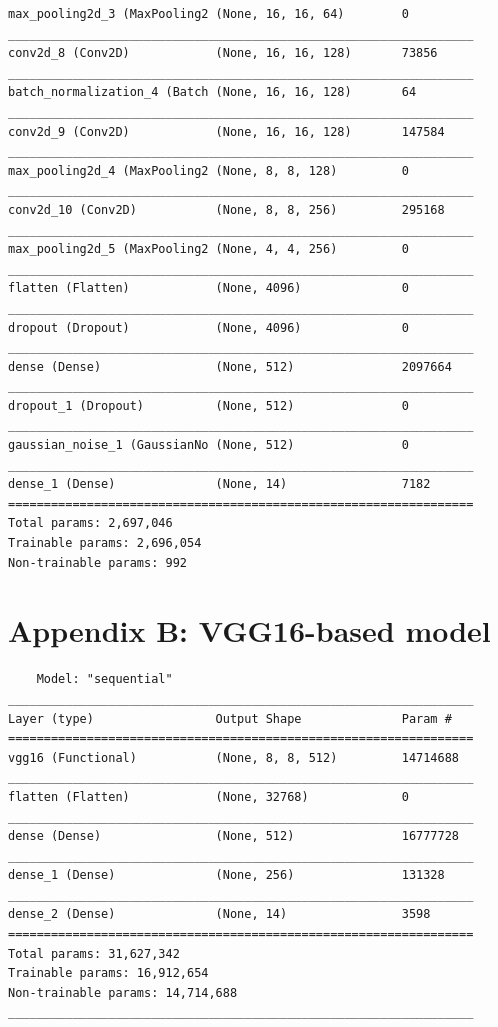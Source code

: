 \documentclass[10.5pt,a4paper,twocolumn]{article}
\begin{document}
\begin{verbatim}
max_pooling2d_3 (MaxPooling2 (None, 16, 16, 64)        0         
_________________________________________________________________
conv2d_8 (Conv2D)            (None, 16, 16, 128)       73856     
_________________________________________________________________
batch_normalization_4 (Batch (None, 16, 16, 128)       64        
_________________________________________________________________
conv2d_9 (Conv2D)            (None, 16, 16, 128)       147584    
_________________________________________________________________
max_pooling2d_4 (MaxPooling2 (None, 8, 8, 128)         0         
_________________________________________________________________
conv2d_10 (Conv2D)           (None, 8, 8, 256)         295168    
_________________________________________________________________
max_pooling2d_5 (MaxPooling2 (None, 4, 4, 256)         0         
_________________________________________________________________
flatten (Flatten)            (None, 4096)              0         
_________________________________________________________________
dropout (Dropout)            (None, 4096)              0         
_________________________________________________________________
dense (Dense)                (None, 512)               2097664   
_________________________________________________________________
dropout_1 (Dropout)          (None, 512)               0         
_________________________________________________________________
gaussian_noise_1 (GaussianNo (None, 512)               0         
_________________________________________________________________
dense_1 (Dense)              (None, 14)                7182      
=================================================================
Total params: 2,697,046
Trainable params: 2,696,054
Non-trainable params: 992
\end{verbatim}

\section{Appendix B: VGG16-based model}
\begin{verbatim}
    Model: "sequential"
_________________________________________________________________
Layer (type)                 Output Shape              Param #   
=================================================================
vgg16 (Functional)           (None, 8, 8, 512)         14714688  
_________________________________________________________________
flatten (Flatten)            (None, 32768)             0         
_________________________________________________________________
dense (Dense)                (None, 512)               16777728  
_________________________________________________________________
dense_1 (Dense)              (None, 256)               131328    
_________________________________________________________________
dense_2 (Dense)              (None, 14)                3598      
=================================================================
Total params: 31,627,342
Trainable params: 16,912,654
Non-trainable params: 14,714,688
_________________________________________________________________
\end{verbatim}
\end{document}
